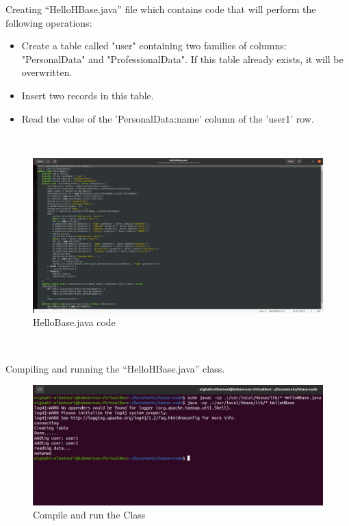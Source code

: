 \begin{spacing}{1.2}
\par Creating “HelloHBase.java” file which contains code that will perform the following operations:
\begin{itemize}
  \item Create a table called "user" containing two families of columns: "PersonalData" and
"ProfessionalData". If this table already exists, it will be overwritten.
  \item Insert two records in this table.
  \item Read the value of the 'PersonalData:name' column of the 'user1' row.
\end{itemize}

\\
\begin{figure}[!htb] 
\begin{center} 
\includegraphics[width=1\linewidth]{Pictures/HBase/Using the HBase Java API/Configure the CLASSPATH in the .bashrc/HelloBase.java code} 
\end{center} 
\caption{HelloBase.java code} 
\end{figure}  \FloatBarrier
\\
\newpage
\par Compiling and running the “HelloHBase.java” class.
\\
\begin{figure}[!htb] 
\begin{center} 
\includegraphics[width=1\linewidth]{Pictures/HBase/Using the HBase Java API/Configure the CLASSPATH in the .bashrc/Compile and run the Class} 
\end{center} 
\caption{Compile and run the Class} 
\end{figure}  \FloatBarrier
\\



\end{spacing}
